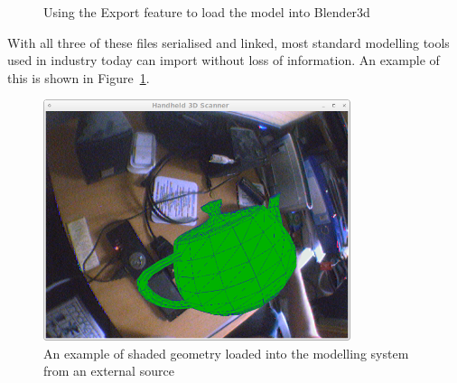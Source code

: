 \documentclass[a4paper,10pt]{report}
\begin{document}
\begin{itemize}
{\begin{figure}
  \begin{center}
  \end{center}
  \caption{Using the Export feature to load the model into Blender3d}
  \label{blender}
\end{figure}

With all three of these files serialised and linked, most standard modelling tools used in industry today can import without loss of information. An example of this is shown in Figure~\ref{blender}.}

\begin{figure}
  \begin{center}
    \includegraphics[width=340px]{Teapot}
  \end{center}
  \caption{An example of shaded geometry loaded into the modelling system from an external source}
  \label{load}
\end{figure}


\end{itemize}
\end{document}
